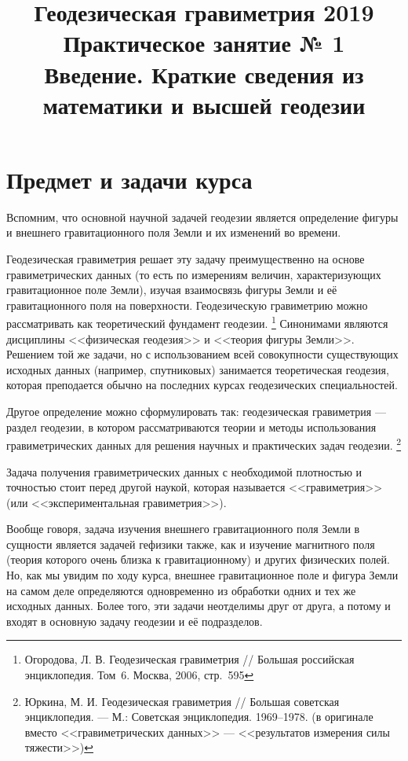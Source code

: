 \documentclass[11pt, a4paper]{article}
\title{{\Large Геодезическая гравиметрия 2019}\\ 
    {\bf\Large Практическое занятие № 1} \\
{\Large Введение. Краткие сведения из математики и высшей геодезии}}
\author{}
\date{\DTMusedate{lessondate}}
\theoremstyle{plain}
\theoremstyle{definition}
\theoremstyle{remark}
\begin{document}
\maketitle

\section{Предмет и задачи курса}
Вспомним, что основной научной задачей геодезии является определение фигуры и внешнего
гравитационного поля Земли и их изменений во времени. 

Геодезическая гравиметрия решает эту задачу
преимущественно на основе гравиметрических данных (то есть по измерениям величин,
характеризующих гравитационное поле Земли), изучая взаимосвязь фигуры Земли и её гравитационного
поля на поверхности. 
Геодезическую гравиметрию можно рассматривать как теоретический фундамент геодезии.
\footnote{Огородова, Л. В. Геодезическая гравиметрия // 
    Большая российская энциклопедия. Том~6. Москва, 2006, стр.~595}
Синонимами являются дисциплины <<физическая геодезия>> и <<теория фигуры Земли>>.
Решением той же задачи, но с использованием всей
совокупности существующих исходных данных (например, спутниковых) занимается теоретическая
геодезия, которая преподается обычно на последних курсах геодезических специальностей.

Другое определение можно сформулировать так: геодезическая гравиметрия ---
раздел геодезии, в котором рассматриваются теории и методы использования гравиметрических данных 
для решения научных и практических задач геодезии.
\footnote{Юркина, М. И. Геодезическая гравиметрия // Большая советская энциклопедия. --- М.:
Советская энциклопедия. 1969--1978. (в оригинале вместо <<гравиметрических данных>> ---
<<результатов измерения силы тяжести>>)}

Задача получения гравиметрических данных с необходимой плотностью и точностью стоит 
перед другой наукой, которая называется <<гравиметрия>> (или <<экспериментальная гравиметрия>>).

Вообще говоря, задача изучения внешнего гравитационного поля Земли в сущности является задачей
гефизики также, как и изучение магнитного поля (теория которого очень близка к гравитационному) 
и других физических полей. Но, как мы увидим по ходу курса, внешнее гравитационное поле и фигура
Земли на самом деле определяются одновременно из обработки одних и тех же исходных данных. Более
того, эти задачи неотделимы друг от друга, а потому и входят в основную задачу геодезии и её подразделов\cite{Pellinen1978}.
\end{document}
